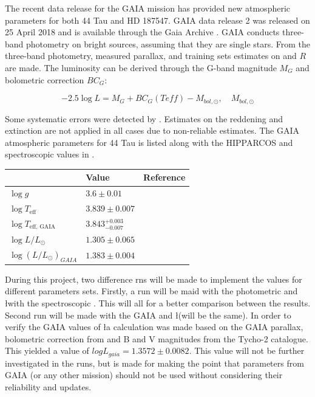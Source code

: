 The recent data release for the GAIA mission has provided new atmospheric parameters for both 44 Tau and HD 187547. GAIA data release 2 was released on 25 April 2018 and is available through the Gaia Archive \citep{brown2018gaia}. GAIA conducts three-band photometry on bright sources, assuming that they are single stars. From the three-band photometry, measured parallax, and training sets estimates on \teff and $R$ are made. 
The luminosity can be derived through the G-band magnitude $M_G$ and bolometric correction $BC_G$:

\begin{equation}
	-2.5\log L = M_G + BC_G(Teff) - M_{bol,\odot}, \quad M_{bol,\odot}
\end{equation}

Some systematic errors were detected by \citet{andrae2018gaia}. Estimates on the reddening and extinction are not applied in all cases due to non-reliable estimates. The GAIA atmospheric parameters for 44 Tau is listed along with the HIPPARCOS and spectroscopic values in . 

\begin{table}[htbp]
\centering
\begin{tabular}{|l|ll|}
\hline
                                                   & Value                                             & Reference \\ \hline
$\log g$                                  &  $3.6 \pm 0.01$                            & \citep{zima2007high}    \\
$\log T_\text{eff}$             & $3.839  \pm 0.007$                   &   \citep{lenz2010delta}   \\
$\log T_\text{eff, GAIA}$ &  $3.843^{+0.003}_{-0.007}$ & \citep{brown2018gaia} \\
$\log L/L_\odot$                  &  $1.305 \pm 0.065$                          & \citep{lenz2010delta}     \\
$\log (L/L_\odot)_{GAIA}$& $1.383 \pm 0.004$                        &  \citep{brown2018gaia}   \\ \hline
\end{tabular}
\end{table}

During this project, two difference rns will be made to implement the values for different parameters sets. Firstly, a run will be maid with the \citet{lenz2010delta} photometric \teff and \l with the spectroscopic \logg. This will all for a better comparison between the results. Second run will be made with the GAIA \teff and \l (\logg will be the same). In order to verify the GAIA values of \l a calculation was made based on the GAIA parallax, bolometric correction from \citet{Flower96} and B and V magnitudes from the Tycho-2 catalogue. This yielded a value of $log L_{gaia} = 1.3572 \pm 0.0082$. This value will not be further investigated in the runs, but is made for making the point that parameters from GAIA (or any other mission) should not be used without considering their reliability and updates. 



